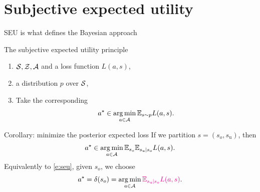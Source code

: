 \documentclass[10pt]{beamer}
\begin{document}
        

\section{Subjective expected utility}
\begin{frame}{SEU is what defines the Bayesian approach}
\begin{block}{The subjective expected utility principle}
\begin{enumerate}
\item {} $\mathcal{S}, \mathcal{Z}, \mathcal{A}$ and a loss function $L(a,s)$,
\item {} a distribution $p$ over $\mathcal{S}$,
\item Take the corresponding 
\begin{equation}
a^\star \in \operatorname*{arg\,min}_{a\in\mathcal{A}} \mathbb{E}_{s\sim p} L(a,s).
\label{e:seu}
\end{equation}
\end{enumerate}
\end{block}
\vfill

\begin{block}{Corollary: minimize the posterior expected loss}
If we partition $s=(s_{o}, s_{\text{u}})$, then
$$ a^\star \in \operatorname*{arg\,min}_{a\in\mathcal{A}} \mathbb{E}_{s_{o}} \mathbb{E}_{s_{\text{u}}\vert s_{o}} L(a,s).$$
Equivalently to \eqref{e:seu}, given $s_o$, we choose
$$
a^\star = \delta(s_o) = \operatorname*{arg\,min}_{a\in\mathcal{A}} \textcolor{magenta}{\mathbb{E}_{s_{\text{u}}\vert s_{o}} L(a,s)}.$$
\end{block}
\end{frame}
\end{document}
